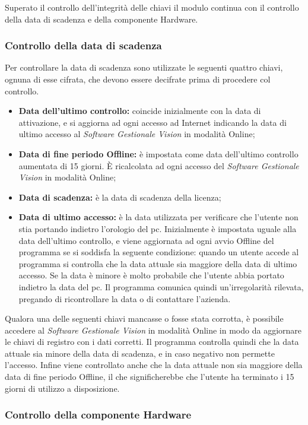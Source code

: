 Superato il controllo dell'integrità delle chiavi il modulo continua con il controllo della data di scadenza e della componente Hardware.

\subsubsection{Controllo della data di scadenza}

Per controllare la data di scadenza sono utilizzate le seguenti quattro chiavi, ognuna di esse cifrata, che devono essere decifrate prima di procedere col controllo. 
\begin{itemize}
\item \textbf{Data dell'ultimo controllo:} coincide inizialmente con la data di attivazione, e si aggiorna ad ogni accesso ad Internet indicando la data di ultimo accesso al \textit{Software Gestionale Vision} in modalità Online;
\item \textbf{Data di fine periodo Offline:} è impostata come data dell'ultimo controllo aumentata di 15 giorni. È ricalcolata ad ogni accesso del \textit{Software Gestionale Vision} in modalità Online;
\item \textbf{Data di scadenza:} è la data di scadenza della licenza;
\item \textbf{Data di ultimo accesso:} è la data utilizzata per verificare che l'utente non stia portando indietro l'orologio del pc. Inizialmente è impostata uguale alla data dell'ultimo controllo, e viene aggiornata ad ogni avvio Offline del programma se si soddisfa la seguente condizione: quando un utente accede al programma si controlla che la data attuale sia  maggiore della data di ultimo accesso. Se la data è minore è molto probabile che l'utente abbia portato indietro la data del pc. Il programma comunica quindi un'irregolarità rilevata, pregando di ricontrollare la data o di contattare l'azienda.
\end{itemize}
Qualora una delle seguenti chiavi mancasse o fosse stata corrotta, è possibile accedere al \textit{Software Gestionale Vision} in modalità Online in modo da aggiornare le chiavi di registro con i dati corretti.
Il programma controlla quindi che la data attuale sia minore della data di scadenza, e in caso negativo non permette l’accesso. Infine viene controllato anche che la data attuale non sia maggiore della data di fine periodo Offline, il che significherebbe che l’utente ha terminato i 15 giorni di utilizzo a disposizione.

\subsubsection{Controllo della componente Hardware}

